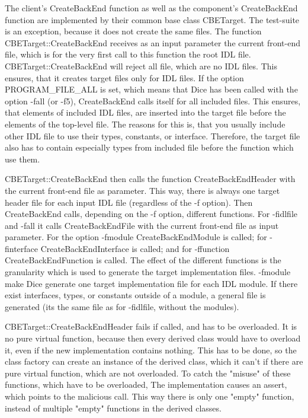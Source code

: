 The client's CreateBackEnd function as well as the component's
CreateBackEnd function are implemented by their common base class
CBETarget. The test-suite is an exception, because it does not create
the same files. The function CBETarget::CreateBackEnd receives as an
input parameter the current front-end file, which is for the very
first call to this function the root IDL
file. CBETarget::CreateBackEnd will reject all file, which are no IDL
files. This ensures, that it creates target files only for IDL
files. If the option PROGRAM_FILE_ALL is set, which means that Dice
has been called with the option -fall (or -f5), CreateBackEnd calls
itself for all included files. This ensures, that elements of included
IDL files, are inserted into the target file before the elements of
the top-level file. The reasons for this is, that you usually include
other IDL file to use their types, constants, or interface. Therefore,
the target file also has to contain especially types from included
file before the function which use them.

CBETarget::CreateBackEnd then calls the function CreateBackEndHeader
with the current front-end file as parameter. This way, there is
always one target header file for each input IDL file (regardless of
the -f option). Then CreateBackEnd calls, depending on the -f option,
different functions. For -fidlfile and -fall it calls
CreateBackEndFile with the current front-end file as input
parameter. For the option -fmodule CreateBackEndModule is called; for
-finterface CreateBackEndInterface is called; and for -ffunction
CreateBackEndFunction is called. The effect of the different functions
is the granularity which is used to generate the target implementation
files. -fmodule make Dice generate one target implementation file for
each IDL module. If there exist interfaces, types, or constants
outside of a module, a general file is generated (its the same file as
for -fidlfile, without the modules).

CBETarget::CreateBackEndHeader fails if called, and has to be
overloaded. It is no pure virtual function, because then every derived
class would have to overload it, even if the new implementation
contains nothing. This has to be done, so the class factory can create
an instance of the derived class, which it can't if there are pure
virtual function, which are not overloaded. To catch the "misuse" of
these functions, which have to be overloaded, The implementation
causes an assert, which points to the malicious call. This way there
is only one "empty" function, instead of multiple "empty" functions in
the derived classes.

